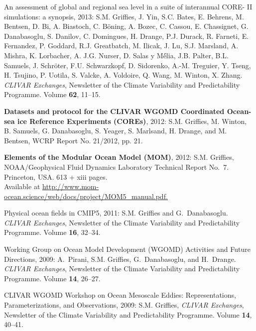 \begin{etaremune}
\item An assessment of global and regional sea level in a suite of interannual CORE- II simulations: a synopsis, 2013:  S.M. Grif\/f\/ies, J. Yin, S.C. Bates, E. Behrens, M.  Bentsen, D. Bi, A. Biastoch, C. B\"{o}ning, A. Bozec, C. Cassou, E. Chassignet, G. Danabasoglu, S. Danilov, C. Domingues, H. Drange, P.J. Durack, R. Farneti, E. Fernandez, P. Goddard, R.J. Greatbatch, M. Ilicak, J. Lu, S.J. Marsland, A. Mishra, K. Lorbacher, A. J.G. Nurser, D. Salas y M\'{é}lia, J.B. Palter, B.L. Samuels,
  J. Schr\"{o}ter, F.U. Schwarzkopf, D. Sidorenko, A.-M. Treguier, Y. Tseng, H. Tsujino, P.  Uotila, S. Valcke, A. Voldoire, Q. Wang, M. Winton, X. Zhang. {\em CLIVAR Exchanges}, Newsletter of the Climate Variability and Predictability Programme. Volume {\bf 62},
  11--15.

\item {\bf Datasets and protocol for the CLIVAR WGOMD Coordinated Ocean-sea ice Reference Experiments (COREs)}, 2012: S.M. Grif\/f\/ies, M. Winton, B. Samuels, G. Danabasoglu, S. Yeager, S. Marlsand, H.  Drange, and M. Bentsen, WCRP Report No. 21/2012, pp. 21.

\item {\bf Elements of the Modular Ocean Model (MOM)}, 2012: S.M. Grif\/f\/ies, NOAA/Geophysical Fluid Dynamics Laboratory Technical Report No.\ 7. Princeton, USA.  613 + xiii pages. \\
  Available at 
  \href{http://www.mom-ocean.science/web/docs/project/MOM5_manual.pdf}{http://www.mom-ocean.science/web/docs/project/MOM5\_manual.pdf.}

\item Physical ocean fields in CMIP5, 2011:  S.M. Grif\/f\/ies and G.\ Danabasoglu. {\em CLIVAR Exchanges}, Newsletter of the Climate Variability and Predictability Programme.  Volume {\bf 16}, 32--34.

\item Working Group on Ocean Model Development (WGOMD) Activities and Future Directions, 2009: A.\ Pirani, S.M. Grif\/f\/ies, G.\ Danabasoglu, and H.\ Drange.  {\em CLIVAR Exchanges}, Newsletter of the Climate Variability and Predictability Programme.  Volume {\bf 14}, 26--27.

\item CLIVAR WGOMD Workshop on Ocean Mesoscale Eddies:
  Representations, Parameterizations, and Observations, 2009: S.M. Grif\/f\/ies, {\em CLIVAR Exchanges}, Newsletter of the Climate Variability and Predictability Programme.  Volume {\bf 14}, 40--41.


\end{etaremune}
